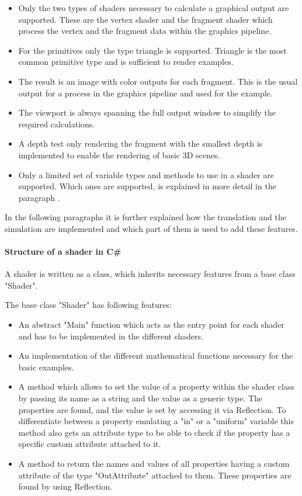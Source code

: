 \begin{itemize}
\item Only the two types of shaders necessary to calculate a graphical output are supported. These are the vertex shader and the fragment shader which process the vertex and the fragment data within the graphics pipeline.

\item For the primitives only the type triangle is supported. Triangle is the most common primitive type and is sufficient to render examples.

\item The result is an image with color outputs for each fragment. This is the usual output for a process in the graphics pipeline and used for the example.

\item The viewport is always spanning the full output window to simplify the required calculations.

\item A depth test only rendering the fragment with the smallest depth is implemented to enable the rendering of basic 3D scenes.

\item Only a limited set of variable types and methods to use in a shader are supported. Which ones are supported, is explained in more detail in the paragraph .
\end{itemize}

In the following paragraphs it is further explained how the translation and the simulation are implemented and which part of them is used to add these features.

\paragraph{Structure of a shader in C\#}

A shader is written as a class, which inherits necessary features from a base class "Shader".

The base class "Shader" has following features:
\begin{itemize}
\item An abstract "Main" function which acts as the entry point for each shader and has to be implemented in the different shaders.
\item An implementation of the different mathematical functions necessary for the basic examples.
\item A method which allows to set the value of a property within the shader class by passing its name as a string and the value as a generic type. The properties are found, and the value is set by accessing it via Reflection. To differentiate between a property emulating a "in" or a "uniform" variable this  method also gets an attribute type to be able to check if the property has a specific custom attribute attached to it.
\item A method to return the names and values of all properties having a custom attribute of the type "OutAttribute" attached to them. These properties are found by using Reflection.
\end{itemize}

